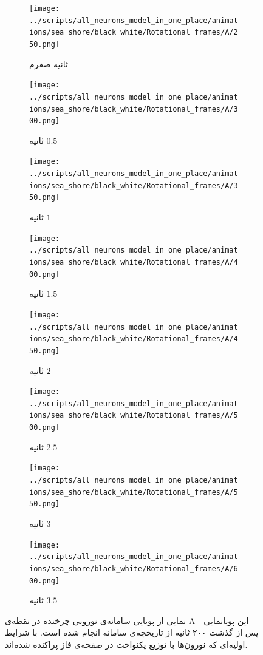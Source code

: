 \begin{figure}
	\begin{subfigure}{0.5\textwidth}
		\texttt{[image: ../scripts/all\_neurons\_model\_in\_one\_place/animations/sea\_shore/black\_white/Rotational\_frames/A/250.png]}
		\caption{
			ثانیه صفرم		
		}
	\end{subfigure}
	\begin{subfigure}{0.5\textwidth}
		\texttt{[image: ../scripts/all\_neurons\_model\_in\_one\_place/animations/sea\_shore/black\_white/Rotational\_frames/A/300.png]}
		\caption{
			ثانیه $0.5$
		}
	\end{subfigure}
	\begin{subfigure}{0.5\textwidth}
		\texttt{[image: ../scripts/all\_neurons\_model\_in\_one\_place/animations/sea\_shore/black\_white/Rotational\_frames/A/350.png]}
		\caption{
			ثانیه $1$		
		}
	\end{subfigure}
	\begin{subfigure}{0.5\textwidth}
		\texttt{[image: ../scripts/all\_neurons\_model\_in\_one\_place/animations/sea\_shore/black\_white/Rotational\_frames/A/400.png]}
		\caption{
			ثانیه $1.5$
		}
	\end{subfigure}
	\begin{subfigure}{0.5\textwidth}
		\texttt{[image: ../scripts/all\_neurons\_model\_in\_one\_place/animations/sea\_shore/black\_white/Rotational\_frames/A/450.png]}
		\caption{
			ثانیه $2$
		}
	\end{subfigure}
	\begin{subfigure}{0.5\textwidth}
		\texttt{[image: ../scripts/all\_neurons\_model\_in\_one\_place/animations/sea\_shore/black\_white/Rotational\_frames/A/500.png]}
		\caption{
			ثانیه $2.5$
		}
	\end{subfigure}
	\begin{subfigure}{0.5\textwidth}
		\texttt{[image: ../scripts/all\_neurons\_model\_in\_one\_place/animations/sea\_shore/black\_white/Rotational\_frames/A/550.png]}
		\caption{
			ثانیه $3$
		}
	\end{subfigure}
	\begin{subfigure}{0.5\textwidth}
		\texttt{[image: ../scripts/all\_neurons\_model\_in\_one\_place/animations/sea\_shore/black\_white/Rotational\_frames/A/600.png]}
		\caption{
			ثانیه $3.5$
		}
	\end{subfigure}
	\caption{
		نمایی از پویایی سامانه‌ی نورونی چرخنده در نقطه‌ی A - این پویانمایی پس از گذشت ۲۰۰ ثانیه از تاریخچه‌ی سامانه انجام شده است. با شرایط اولیه‌ای که نورون‌ها با توزیع یکنواخت در صفحه‌ی فاز پراکنده شده‌اند.	
	}
	\label{fig:rotational_animation_A}
\end{figure}
\restoregeometry 

